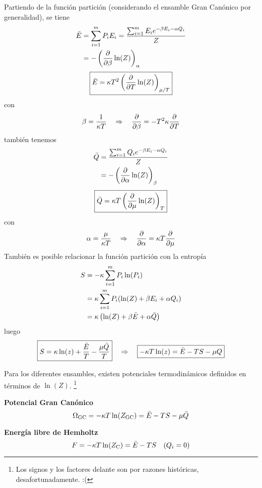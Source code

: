 Partiendo de la función partición (considerando el ensamble Gran Canónico por generalidad), se tiene
\begin{align}
  \bar{E}&=\sum_{i=1}^m P_iE_i=\frac{\sum_{i=1}^m E_ie^{-\beta E_i-\alpha Q_i}}{Z}\\
  &=-\left(\pdv{\beta}\ln(Z)\right)_\alpha\label{E=partial-beta}
\end{align}
\begin{equation}
\boxed{  \bar{E}=\kappa T^2\left(\pdv{T}\ln(Z)\right)_{\mu/T}}
\end{equation}
con \begin{equation}
  \beta =\frac{1}{\kappa T}\quad \Rightarrow\quad \pdv{\beta}=-T^2\kappa\pdv{T}
\end{equation}
también tenemos
\begin{align}
  \bar{Q}&=\frac{\sum_{i=1}^m Q_ie^{-\beta E_i-\alpha Q_i}}{Z}\\
  &=-\left(\pdv{\alpha}\ln(Z)\right)_\beta 
\end{align}
\begin{equation}
 \boxed{ \bar{Q}=\kappa T\left(\pdv{\mu}\ln(Z)\right)_T}
\end{equation}
con
\begin{equation}
  \alpha =\frac{\mu }{\kappa T}\quad \Rightarrow\quad \pdv{\alpha}=\kappa T\pdv{\mu}
\end{equation}
También es posible relacionar la función partición con la entropía
\begin{align}
  S&=-\kappa \sum_{i=1}^m P_i\ln(P_i)\\
  &=\kappa\sum_{i=1}^m P_i(\ln(Z)+\beta E_i+\alpha Q_i)\\
  &=\kappa \left(\ln(Z)+\beta \bar{E}+\alpha \bar{Q}\right)
\end{align}
luego
\begin{equation}
\boxed{  S=\kappa \ln(z)+\frac{\bar{E}}{T}-\frac{\mu \bar{Q}}{T}}\quad \Rightarrow\quad \boxed{-\kappa T\ln(z)=\bar{E}-TS-\mu Q}
\end{equation}

Para los diferentes ensambles, existen potenciales termodinámicos definidos en términos de $\ln(Z)$. \footnote{Los signos y los factores delante son por razones históricas, desafortunadamente. :(}

\textbf{Potencial Gran Canónico}
\begin{equation}
  \Omega_{\rm GC}=-\kappa T\ln(Z_{\rm GC})=\bar{E}-TS-\mu\bar{Q}
\end{equation}

\textbf{Energía libre de Hemholtz}
\begin{equation}
  F=-\kappa T\ln(Z_{\rm C})=\bar{E}-TS\quad (Q_i=0)
\end{equation}

